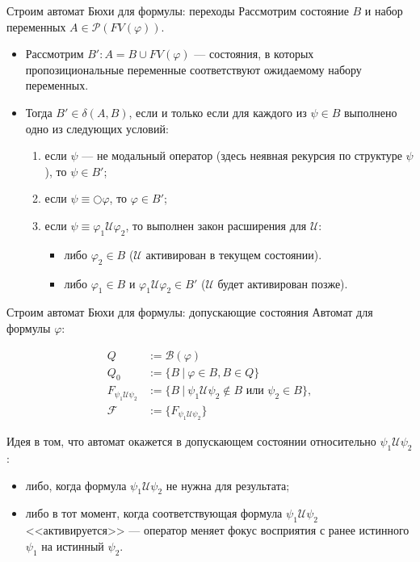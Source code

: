 \documentclass[aspectratio=169,dvipsnames,usenames]{beamer}
\begin{document}
\begin{frame}{Строим автомат Бюхи для формулы: переходы}
Рассмотрим состояние $B$ и набор переменных $A \in \mathcal{P}(FV(\varphi))$.
\begin{itemize}
\item Рассмотрим $B': A = B\cup FV(\varphi)$ --- состояния, в которых
пропозициональные переменные соответствуют ожидаемому набору переменных.
\item Тогда $B' \in \delta(A,B)$, если и только если для каждого из $\psi\in B$
выполнено одно из следующих условий:
\begin{enumerate}
\item 
если $\psi$ --- не модальный оператор (здесь неявная рекурсия по структуре $\psi$), то $\psi\in B'$;
\item если $\psi\equiv\bigcirc\varphi$, то $\varphi\in B'$;
\item если $\psi \equiv \varphi_1\mathcal{U}\varphi_2$, то выполнен закон расширения для $\mathcal{U}$:
\begin{itemize}
\item либо $\varphi_2 \in B$ ($\mathcal{U}$ активирован в текущем состоянии).
\item либо $\varphi_1 \in B$ и $\varphi_1 \mathcal{U} \varphi_2 \in B'$
($\mathcal{U}$ будет активирован позже).
\end{itemize}
\end{enumerate}
\end{itemize}
\end{frame}

\begin{frame}{Строим автомат Бюхи для формулы: допускающие состояния}
Автомат для формулы $\varphi$:

$$\begin{array}{ll}Q &:= \mathcal{B}(\varphi) \\ Q_0 &:= \{ B\ |\ \varphi\in B, B\in Q\} \\
F_{\psi_1\mathcal{U}\psi_2} &:= \{B\ |\ \psi_1\mathcal{U}\psi_2 \not\in B \text{ или } \psi_2\in B\}, \\
\mathcal{F}&:=\{F_{\psi_1\mathcal{U}\psi_2}\}\end{array}$$

Идея в том, что автомат окажется в допускающем состоянии относительно $\psi_1\mathcal{U}\psi_2$:
\begin{itemize}
\item либо, когда формула $\psi_1\mathcal{U}\psi_2$ не нужна для результата;
\item либо в тот момент, когда соответствующая 
формула $\psi_1\mathcal{U}\psi_2$ <<активируется>> --- оператор меняет фокус восприятия
с ранее истинного $\psi_1$ на истинный $\psi_2$.
\end{itemize}
\end{frame}
\end{document}

